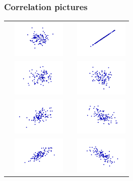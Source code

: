 \documentclass[smaller]{beamer}
\begin{document}
\begin{frame}
\frametitle{Correlation pictures}

\begin{tabular}{cccc}
\raisebox{.3in}{$r = 0$} & \includegraphics[width=1in]{corr000.png}
&
\raisebox{.3in}{$r = 1$} & \includegraphics[width=1in]{corr100.png}
\\
\raisebox{.3in}{$r = 0.25$} & \includegraphics[width=1in]{corr025.png}
&
\raisebox{.3in}{$r = -0.25$} & \includegraphics[width=1in]{corr-025.png}
\\
\raisebox{.3in}{$r = 0.5$} & \includegraphics[width=1in]{corr050.png}
&
\raisebox{.3in}{$r = -0.5$} & \includegraphics[width=1in]{corr-050.png}
\\
\raisebox{.3in}{$r = 0.75$} & \includegraphics[width=1in]{corr075.png} 
&
\raisebox{.3in}{$r = -0.75$} & \includegraphics[width=1in]{corr-075.png}
\end{tabular}

\end{frame}
\end{document}
